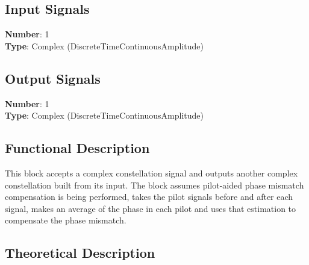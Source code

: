 \begin{refsection}
\subsection*{Input Signals}

\textbf{Number}: 1\\
\textbf{Type}: Complex (DiscreteTimeContinuousAmplitude)


\subsection*{Output Signals}

\textbf{Number}: 1\\
\textbf{Type}: Complex (DiscreteTimeContinuousAmplitude)

\subsection*{Functional Description}

This block accepts a complex constellation signal and outputs another complex constellation built from its input. The block assumes pilot-aided phase mismatch compensation is being performed, takes the pilot signals before and after each signal, makes an average of the phase in each pilot and uses that estimation to compensate the phase mismatch.

\subsection*{Theoretical Description}\label{bercalc}


\end{refsection}
